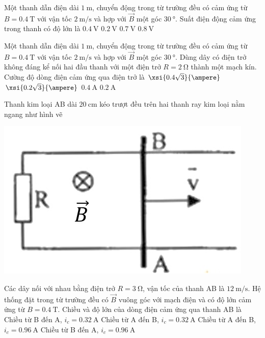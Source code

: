 \begin{ex}
	Một thanh dẫn điện dài $\SI{1}{\meter}$, chuyển động trong từ trường đều có cảm ứng từ $B=\SI{0.4}{\tesla}$ với vận tốc $\SI{2}{\meter/\second}$ và hợp với $\vec{B}$ một góc $\SI{30}{\degree}$. Suất điện động cảm ứng trong thanh có độ lớn là
	\choice
	{$\SI{0.4}{\volt}$}
	{$\SI{0.2}{\volt}$}
	{$\SI{0.7}{\volt}$}
	{$\SI{0.8}{\volt}$}
\end{ex}
\begin{ex}
	Một thanh dẫn điện dài $\SI{1}{\meter}$, chuyển động trong từ trường đều có cảm ứng từ $B=\SI{0.4}{\tesla}$ với vận tốc $\SI{2}{\meter/\second}$ và hợp với $\vec{B}$ một góc $\SI{30}{\degree}$. Dùng dây có điện trở không đáng kể nối hai đầu thanh với một điện trở $R=\SI{2}{\ohm}$ thành một mạch kín. Cường độ dòng điện cảm ứng qua điện trở là
	\choice
	{$\xsi{0.4\sqrt{3}}{\ampere}$}
	{$\xsi{0.2\sqrt{3}}{\ampere}$}
	{$\SI{0.4}{\ampere}$}
	{\True $\SI{0.2}{\ampere}$}
\end{ex}
\begin{ex}
	Thanh kim loại AB dài $\SI{20}{\centi\meter}$ kéo trượt đều trên hai thanh ray kim loại nằm ngang như hình vẽ
	\begin{center}
		\includegraphics[width=0.25\linewidth]{figs/VN12-Y24-PH-SYL-022P-5}
	\end{center}
	Các dây nối với nhau bằng điện trở $R=\SI{3}{\ohm}$, vận tốc của thanh AB là $\SI{12}{\meter/\second}$. Hệ thống đặt trong từ trường đều có $\vec{B}$ vuông góc với mạch điện và có độ lớn cảm ứng từ $B=\SI{0.4}{\tesla}$. Chiều và độ lớn của dòng điện cảm ứng qua thanh AB là
	\choice
	{Chiều từ B đến A, $i_c=\SI{0.32}{\ampere}$}
	{\True Chiều từ A đến B, $i_c=\SI{0.32}{\ampere}$}
	{Chiều từ A đến B, $i_c=\SI{0.96}{\ampere}$}
	{Chiều từ B đến A, $i_c=\SI{0.96}{\ampere}$}
\end{ex}
